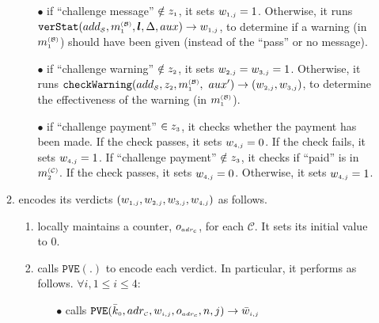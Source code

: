 \begin{enumerate}
\begin{enumerate}
\begin{itemize}
%
\item[$\bullet$]  if  ``challenge message'' $\notin z_{\scriptscriptstyle 1}$, it sets $w_{\scriptscriptstyle 1,j}= 1$. Otherwise,  it runs $\mathtt{verStat}(add_{\scriptscriptstyle\mathcal{S}}, m_{\scriptscriptstyle 1}^{\scriptscriptstyle(\mathcal{B})},  \bm{l}, \Delta, {aux})\rightarrow w_{\scriptscriptstyle 1, j}$, to determine if a warning (in $m_{\scriptscriptstyle 1}^{\scriptscriptstyle(\mathcal{B})}$) should have been given (instead of the ``pass'' or no message). %
%
\item[$\bullet$]  if ``challenge warning'' $\notin z_{\scriptscriptstyle 2}$, it sets $w_{\scriptscriptstyle 2, j}= w_{\scriptscriptstyle 3, j}= 1$. Otherwise, it runs $\mathtt{checkWarning}(add_{\scriptscriptstyle\mathcal{S}}, z_{\scriptscriptstyle 2}, m_{\scriptscriptstyle 1}^{\scriptscriptstyle(\mathcal{B})},$ $  {aux}')\rightarrow (w_{\scriptscriptstyle 2, j}, w_{\scriptscriptstyle 3, j})$, to determine the effectiveness of the warning (in $m_{\scriptscriptstyle 1}^{\scriptscriptstyle(\mathcal{B})}$). %



\item[$\bullet$]  if ``challenge payment'' $\in z_{\scriptscriptstyle 3}$, it checks whether the  payment has been  made.   If the check passes, it sets  $w_{\scriptscriptstyle 4, j}=0$. If the check fails,   it sets $w_{\scriptscriptstyle 4, j}=1$.  If ``challenge payment'' $\notin z_{\scriptscriptstyle 3}$, it checks if  ``paid'' is in ${m}_{\scriptscriptstyle 2}^{\scriptscriptstyle(\mathcal C)}$. If the check passes, it sets $w_{\scriptscriptstyle 4, j}=0$. Otherwise, it sets $w_{\scriptscriptstyle 4, j}=1$. 
%
\end{itemize}
%
\item  encodes  its verdicts $(w_{\scriptscriptstyle 1, j}, w_{\scriptscriptstyle 2, j}, w_{\scriptscriptstyle 3, j},  w_{\scriptscriptstyle 4, j})$ as follows. 
%
\begin{enumerate}
%
\item locally maintains a counter, $o_{\scriptscriptstyle adr_{\scriptscriptstyle{c}}}$,  for each $\mathcal{C}$. It sets its initial value to $0$.
%


\item calls $\mathtt{PVE}(.)$ to encode each verdict. In particular, it performs as follows. $\forall i, 1\leq i \leq 4:$
\begin{enumerate}
%

\item[$\bullet$] calls $\mathtt{PVE}(\bar{k}_{\scriptscriptstyle 0}, adr_{\scriptscriptstyle\mathcal{C}},  w_{\scriptscriptstyle i, j}, o_{\scriptscriptstyle adr_{\scriptscriptstyle{c}}}, n,  j)\rightarrow  \bar{  w}_{\scriptscriptstyle i,j}$


\end{enumerate}
\end{enumerate}
\end{enumerate}
\end{enumerate}
